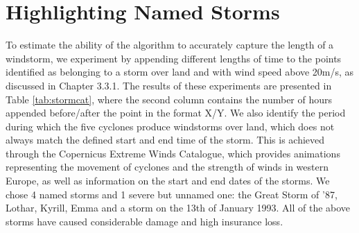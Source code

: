 \section{Highlighting Named Storms}

    To estimate the ability of the algorithm to accurately capture the length of a windstorm, we experiment by appending different lengths of time to the points identified as belonging to a storm over land and with wind speed above 20m/s, as discussed in Chapter 3.3.1. The results of these experiments are presented in Table \ref{tab:stormcat}, where the second column contains the number of hours appended before/after the point in the format X/Y. We also identify the period during which the five cyclones produce windstorms over land, which does not always match the defined start and end time of the storm. This is achieved through the Copernicus Extreme Winds Catalogue, which provides animations representing the movement of cyclones and the strength of winds in western Europe, as well as information on the start and end dates of the storms. We chose 4 named storms and 1 severe but unnamed one: the Great Storm of '87, Lothar, Kyrill, Emma and a storm on the 13th of January 1993. All of the above storms have caused considerable damage and high insurance loss. 


